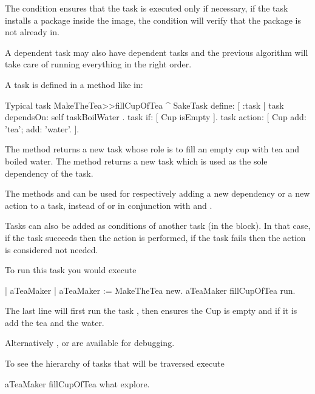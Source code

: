 \documentclass[a4paper,10pt,twoside]{book}
\begin{document}
The condition ensures that the task is executed only if necessary,
\eg{} if the task installs a package inside the image, the condition
will verify that the package is not already in.

A dependent task may also have dependent tasks and the previous
algorithm will take care of running everything in the right order.

A task is defined in a method like in:

\begin{method}{Typical task}
MakeTheTea>>fillCupOfTea
  ^ SakeTask define: 
                   [ :task |
                        task dependsOn: { self taskBoilWater }.
                        task if: [ Cup isEmpty ].
                        task action: [ Cup add: 'tea'; add: 'water'. ].
\end{method}

The method  returns a new task whose role is to fill
an empty cup with tea and boiled water. The method 
returns a new task which is used as the sole dependency of the
 task.

The methods  and  can be used for
respectively adding a new dependency or a new action to a task, instead of or in conjunction with  and .

Tasks can also be added as conditions of another task (in the 
block). In that case, if the task succeeds then the action is
performed, if the task fails then the action is considered not needed.

To run this task you would execute

\begin{code}{}
  | aTeaMaker |
  aTeaMaker := MakeTheTea new.
  aTeaMaker fillCupOfTea run.
\end{code}

The last line will first run the task , then ensures
the Cup is empty and if it is add the tea and the water.

Alternatively , or  are available for
debugging.

To see the hierarchy of tasks that will be traversed execute

\begin{code}{}
  aTeaMaker fillCupOfTea what explore.
\end{code}

\end{document}
